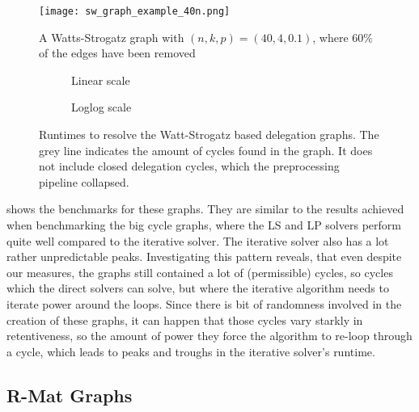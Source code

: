\begin{figure}
\centering
\texttt{[image: sw\_graph\_example\_40n.png]}
\caption{A Watts-Strogatz graph with $(n, k, p) = (40, 4, 0.1)$, where $60\%$ of the edges have been removed}
\label{fig:ws_example}
\end{figure}

\begin{figure}[t]
    \centering
    \begin{subfigure}[t]{0.45\textwidth}
        \centering
        \caption{Linear scale}
        \label{subfig:sw_linear}
    \end{subfigure}
    \hfill
    \begin{subfigure}[t]{0.45\textwidth}
        \centering
        \caption{Loglog scale}
        \label{subfig:sw_loglog}
    \end{subfigure}
    \caption{Runtimes to resolve the Watt-Strogatz based delegation graphs. The grey line indicates the amount of cycles found in the graph. It does not include closed delegation cycles, which the preprocessing pipeline collapsed.}
    \label{fig:sw}
\end{figure}




 shows the benchmarks for these graphs. They are similar to the results achieved when benchmarking the big cycle graphs, where the LS and LP solvers perform quite well compared to the iterative solver. The iterative solver also has a lot rather unpredictable peaks. Investigating this pattern reveals, that even despite our measures, the graphs still contained a lot of (permissible) cycles, so cycles which the direct solvers can solve, but where the iterative algorithm needs to iterate power around the loops. Since there is bit of randomness involved in the creation of these graphs, it can happen that those cycles vary starkly in retentiveness, so the amount of power they force the algorithm to re-loop through a cycle, which leads to peaks and troughs in the iterative solver's runtime. 
 

\subsection{R-Mat Graphs}

